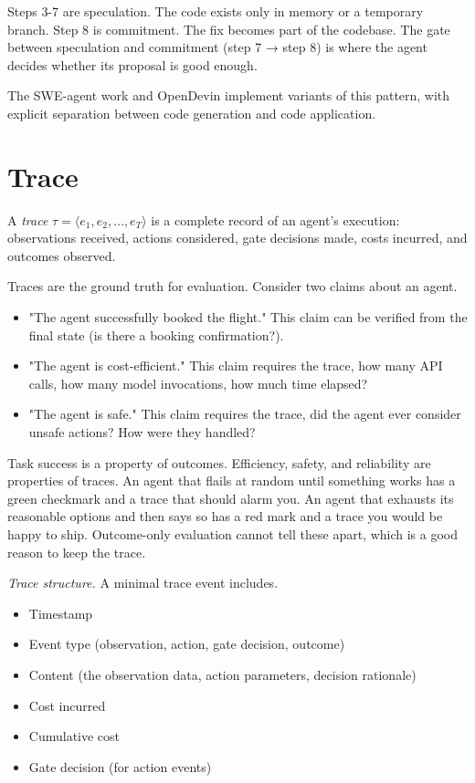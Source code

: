 Steps 3-7 are speculation. The code exists only in memory or a temporary branch. Step 8 is commitment. The fix becomes part of the codebase. The gate between speculation and commitment (step 7 → step 8) is where the agent decides whether its proposal is good enough.

The SWE-agent work \cite{yang2024sweagent} and OpenDevin \cite{wang2024opendevin} implement variants of this pattern, with explicit separation between code generation and code application.

\section{Trace}

A \emph{trace} $\tau = \langle e_1, e_2, \ldots, e_T \rangle$ is a complete record of an agent's execution: observations received, actions considered, gate decisions made, costs incurred, and outcomes observed.

Traces are the ground truth for evaluation. Consider two claims about an agent.

\begin{itemize}
\item "The agent successfully booked the flight." This claim can be verified from the final state (is there a booking confirmation?).
\item "The agent is cost-efficient." This claim requires the trace, how many API calls, how many model invocations, how much time elapsed?
\item "The agent is safe." This claim requires the trace, did the agent ever consider unsafe actions? How were they handled?
\end{itemize}

Task success is a property of outcomes. Efficiency, safety, and reliability are properties of traces. An agent that flails at random until something works has a green checkmark and a trace that should alarm you. An agent that exhausts its reasonable options and then says so has a red mark and a trace you would be happy to ship. Outcome-only evaluation cannot tell these apart, which is a good reason to keep the trace.

\textit{Trace structure.} A minimal trace event includes.

\begin{itemize}
\item Timestamp
\item Event type (observation, action, gate decision, outcome)
\item Content (the observation data, action parameters, decision rationale)
\item Cost incurred
\item Cumulative cost
\item Gate decision (for action events)
\end{itemize}


